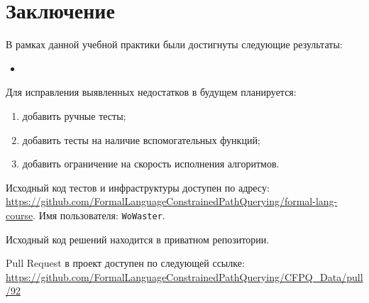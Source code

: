 
\section*{Заключение}
В рамках данной учебной практики были достигнуты следующие результаты:
\begin{itemize}
    \item {}
\end{itemize}

Для исправления выявленных недостатков в будущем планируется:
\begin{enumerate}
    \item добавить ручные тесты;
    \item добавить тесты на наличие вспомогательных функций;
    \item добавить ограничение на скорость исполнения алгоритмов.
\end{enumerate}

Исходный код тестов и инфраструктуры доступен по адресу: \url{https://github.com/FormalLanguageConstrainedPathQuerying/formal-lang-course}.
Имя пользователя: \texttt{WoWaster}.

Исходный код решений находится в приватном репозитории.

Pull Request в проект \cfpqdata{} доступен по следующей ссылке: \url{https://github.com/FormalLanguageConstrainedPathQuerying/CFPQ_Data/pull/92}
